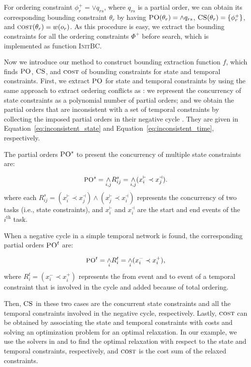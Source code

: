 \documentclass[letterpaper]{article} %
\theoremstyle{definition}
\begin{document}
For ordering constraint $\phi^+_r = \lor q_{rs}$, where $q_{rs}$ is a partial order, we can obtain its corresponding bounding constraint $\theta_r$ by having $\textsc{PO}(\theta_r) = \land q_{rs}$, $\textsc{CS}(\theta_r) = \{\phi^+_r\}$, and  $\textsc{cost}(\theta_r) = w(o_r)$. As this procedure is easy, we extract the bounding constraints for all the ordering constraints $\Phi^+$ before search, which is implemented as function \textsc{InitBC}.

Now we introduce our method to construct bounding extraction function $f$, which finds $\textsc{PO}$, $\textsc{CS}$, and $\textsc{cost}$ of bounding constraints for state and temporal constraints. First, we extract $\textsc{PO}$ for state and temporal constraints by using the same approach to extract ordering conflicts as \cite{chen2019efficiently}: we represent the concurrency of state constraints as a polynomial number of partial orders; and we obtain the partial orders that are inconsistent with a set of temporal constraints by collecting the imposed partial orders in their negative cycle \cite{dechter1991temporal}. They are given in Equation~\ref{eq:inconsistent_state} and Equation~\ref{eq:inconsistent_time}, respectively.

The partial orders $\textsc{PO}^s$ to present the concurrency of multiple state constraints are:

\begin{equation}\small
\label{eq:inconsistent_state}
    \textsc{PO}^{s} = \underset{i,j}{\land}R^{s}_{ij} = \underset{i,j}{\land} (x_i^\vdash \prec x_j^\dashv).
\end{equation}
where each $R^s_{ij} = (x_i^\vdash \prec x_j^\dashv) \land (x_j^\vdash \prec x_i^\dashv)$ represents the concurrency of two tasks (i.e., state constraints), and $x_i^\vdash$ and $x_i^\dashv$ are the start and end events of the $i^{\text{th}}$ task.

When a negative cycle in a simple temporal network is found, the corresponding partial orders $\textsc{PO}^t$ are:

\begin{equation}\small
\label{eq:inconsistent_time}
    \textsc{PO}^{t} = \underset{i}{\land}R^t_i = \underset{i}{\land}(x_i^- \prec x_i^+),
\end{equation}
where $R^t_i = (x_i^- \prec x_i^+)$ represents the from event and to event of a temporal constraint that is involved in the cycle and added because of total ordering.

Then, $\textsc{CS}$ in these two cases are the concurrent state constraints and all the temporal constraints involved in the negative cycle, respectively.  Lastly, $\textsc{cost}$ can be obtained by associating the state and temporal constraints with costs and solving an optimization problem for an optimal relaxation. In our example, we use the solvers in \cite{chen2018radmax} and \cite{yu2013continuously} to find the optimal relaxation with respect to the state and temporal constraints, respectively, and $\textsc{cost}$ is the cost sum of the relaxed constraints.
\end{document}
